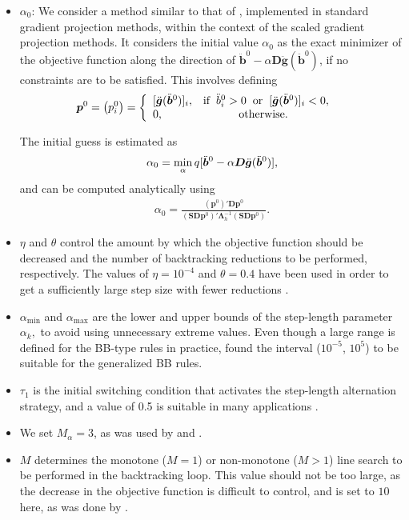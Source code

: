 \documentclass[11pt]{article}
\newcommand{\0}{\phantom{0}}
\begin{document}
\begin{itemize}
	\item $\alpha_0$: We consider a method similar to that of \citet{Figueiredo2007}, implemented in standard gradient projection methods, within the context of the scaled gradient projection methods. It considers the initial value $\alpha_{0}$ as the exact minimizer of the objective function along the direction of $\ddot{\bm{b}}^{0} - \alpha \bm{D} \ddot{\bm{g}}(\ddot{\bm{b}}^{0})$, if no constraints are to be satisfied. This involves defining
	\begin{align*}
	\bm{p}^{0} = \left(p^{0}_{i}\right)& =
	\left\{\begin{array}{ll}
	[\ddot{\bm{g}}(\ddot{\bm{b}}^{0})]_{i}, & \mbox{$\text{if} \hspace{2mm} \ddot{b}_{i}^{0} > 0 \hspace{2mm} \text{or} \hspace{2mm} [\ddot{\bm{g}}(\ddot{\bm{b}}^{0})]_{i} < 0,$}\\
	0, & \mbox{\hspace{1cm} \text{otherwise}}.
	\end{array}\right.
	\end{align*}

	The initial guess is estimated as
	\begin{align*}
	\alpha_{0} = \operatornamewithlimits{min}_{\alpha} q[\ddot{\bm{b}}^{0} - \alpha \bm{D} \ddot{\bm{g}}(\ddot{\bm{b}}^{0})],
	\end{align*}
	and can be computed analytically using
	\begin{align*}
	\alpha_{0} = \frac{(\bm{p}^{0})'\bm{D}\bm{p}^{0}}{(\bm{S}\bm{D}\bm{p}^{0})'\bm{\Lambda}_{h}^{-1}(\bm{S}\bm{D}\bm{p}^{0})}.
	\end{align*}
	\item $\eta$ and $\theta$ control the amount by which the objective function should be decreased and the number of backtracking reductions to be performed, respectively. The values of $\eta = 10^{-4}$ and $\theta = 0.4$ have been used in order to get a sufficiently large step size with fewer reductions \citep{Bonettini2009}.
	\item $\alpha_{\text{min}}$ and $\alpha_{\text{max}}$ are the lower and upper bounds of the step-length parameter $\alpha_{k},$ to avoid using unnecessary extreme values. Even though a large range is defined for the BB-type rules in practice, \citet{Bertero2013} found the interval ($10^{-5}$, $10^{5}$) to be suitable for the generalized BB rules.
	\item $\tau_{1}$ is the initial switching condition that activates the step-length alternation strategy, and a value of 0.5 is suitable in many applications \citep{Bonettini2009, Bertero2013}.
	\item We set $M_{\alpha} = 3$, as was used by \citet{Bonettini2009} and \citet{Bertero2013}.
	\item $M$ determines the monotone ($M =1$) or non-monotone ($M > 1$) line search to be performed in the backtracking loop. This value should not be too large, as the decrease in the objective function is difficult to control, and is set to $10$ here, as was done by \citet{Bonettini2009}.
\end{itemize}
\end{document}
